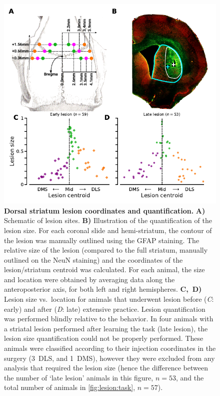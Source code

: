 \begin{figure}[bth!]
	\begin{center}
		\includegraphics[scale=1]{ch-methods/figures/LesionSizeLocation.pdf}
		\caption[Lesion Coordinates and Quantification]
		{\textbf{Dorsal striatum lesion coordinates and quantification.}
		\textbf{A)} Schematic of lesion sites.
		\textbf{B)} Illustration of the quantification of the lesion size.
		For each coronal slide and hemi-striatum, the contour of the lesion was manually outlined using the GFAP staining.
		The relative size of the lesion (compared to the full striatum, manually outlined on the NeuN staining) and the coordinates of the lesion/striatum centroid was calculated.
		For each animal, the size and location were obtained by averaging data along the anteroposterior axis, for both left and right hemispheres.
		\textbf{C,~D)} Lesion size vs.\ location for animals that underwent lesion before (\textit{C}: early) and after (\textit{D}: late) extensive practice.
		Lesion quantification was performed blindly relative to the behavior.
		In four animals with a striatal lesion performed after learning the task (late lesion), the lesion size quantification could not be properly performed.
		These animals were classified according to their injection coordinates in the surgery (3~DLS, and 1~DMS), however they were excluded from any analysis that required the lesion size (hence the difference between the number of `late lesion' animals in this figure, $n=53$, and the total number of animals in \autoref{fig:lesion:task}, $n=57$).
		}
		\label{fig:method:LesionSizeLocation}
	\end{center}
\end{figure}